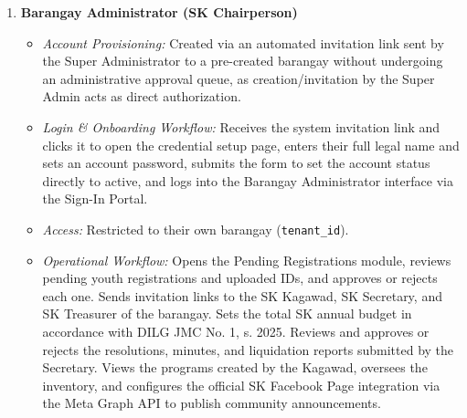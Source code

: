 \begin{enumerate}
    \item \textbf{Barangay Administrator (SK Chairperson)}
    \begin{itemize}
        \item \textit{Account Provisioning:} Created via an automated invitation link sent by the Super Administrator to a pre-created barangay without undergoing an administrative approval queue, as creation/invitation by the Super Admin acts as direct authorization.
        \item \textit{Login \& Onboarding Workflow:} Receives the system invitation link and clicks it to open the credential setup page, enters their full legal name and sets an account password, submits the form to set the account status directly to active, and logs into the Barangay Administrator interface via the Sign-In Portal.
        \item \textit{Access:} Restricted to their own barangay (\texttt{tenant\_id}).
        \item \textit{Operational Workflow:} Opens the Pending Registrations module, reviews pending youth registrations and uploaded IDs, and approves or rejects each one. Sends invitation links to the SK Kagawad, SK Secretary, and SK Treasurer of the barangay. Sets the total SK annual budget in accordance with DILG JMC No. 1, s. 2025. Reviews and approves or rejects the resolutions, minutes, and liquidation reports submitted by the Secretary. Views the programs created by the Kagawad, oversees the inventory, and configures the official SK Facebook Page integration via the Meta Graph API to publish community announcements.
    \end{itemize}


\end{enumerate}
